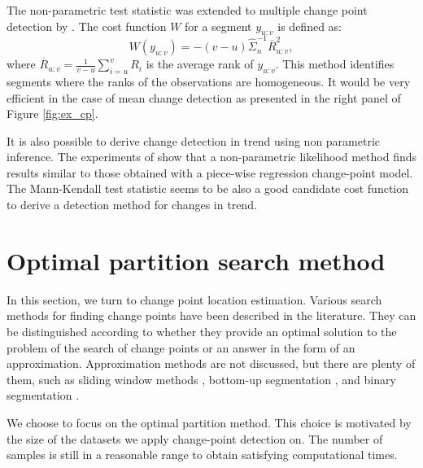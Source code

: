 The non-parametric test statistic was extended to multiple change point detection by \cite{lung2015}. The cost function $W$ for a segment $y_{u:v}$ is defined as: 
\begin{equation}\label{chp2:costfuncnp}
  W(y_{u:v}) = -(v-u)\hat{\Sigma}^{-1}_n\overline{R}^2_{u:v},
\end{equation}
where $\overline{R}_{u:v} = \frac{1}{v-u}\sum_{i = u}^vR_i$ is the average rank of $y_{u:v}$.
This method identifies segments where the ranks of the observations are homogeneous. It would be very efficient in the case of mean change detection as presented in the right panel of Figure \ref{fig:ex_cp}.  

It is also possible to derive change detection in trend using non parametric inference. The experiments of \cite{Haynes2016} show that a non-parametric likelihood method finds results similar to those obtained with a piece-wise regression change-point model. The Mann-Kendall test statistic \citep{Pohlert2020,1994a} seems to be also a good candidate cost function to derive a detection method for changes in trend.  


\section{Optimal partition search method}\label{chp:3:2}

In this section, we turn to change point location estimation. Various search methods for finding change points have been described in the literature. They can be distinguished according to whether they provide an optimal solution to the problem of the search of change points or an answer in the form of an approximation. Approximation methods are not discussed, but there are plenty of them, such as sliding window methods \citep{Li2010,Liu2022}, bottom-up segmentation \citep{chen1998speaker}, and binary segmentation \citep{Yang2001,Fryzlewicz2014}. 

We choose to focus on the optimal partition method. This choice is motivated by the size of the datasets we apply change-point detection on. The number of samples is still in a reasonable range to obtain satisfying computational times.  

